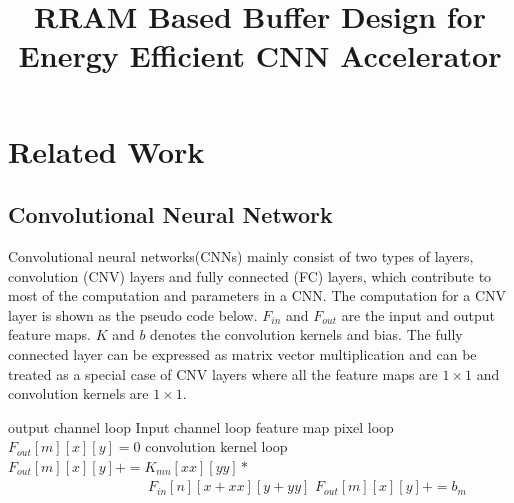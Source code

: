 \documentclass[10pt, conference]{IEEEtran}
\begin{document}
    
    \title{\Large\textbf{RRAM Based Buffer Design for Energy Efficient CNN Accelerator}}
    
    \author{
    }
    
    \maketitle
    
        
    
    
    
    
    \section{Related Work}
    \subsection{Convolutional Neural Network}
    Convolutional neural networks(CNNs) mainly consist of two types of layers, convolution (CNV) layers and fully connected (FC) layers, which contribute to most of the computation and parameters in a CNN. The computation for a CNV layer is shown as the pseudo code below. $F_{in}$ and $F_{out}$ are the input and output feature maps. $K$ and $b$ denotes the convolution kernels and bias. The fully connected layer can be expressed as matrix vector multiplication and can be treated as a special case of CNV layers where all the feature maps are $1\times 1$ and convolution kernels are $1\times 1$.
    
    \begin{codebox}
    \li \Comment output channel loop
    \li {} 
      \Do
    \li   \Comment Input channel loop
    \li   {}
        \Do
    \li  	\Comment feature map pixel loop
    \li 	{}
        \Do
    \li   	  $F_{out}[m][x][y]=0$
    \li 	  \Comment convolution kernel loop
    \li 	  {}
              \Do
    \li 		$F_{out}[m][x][y] += K_{mn}[xx][yy]*$\\
          $\qquad\qquad\qquad\qquad\qquad F_{in}[n][x+xx][y+yy] $
              \End
    \li 	  $F_{out}[m][x][y]+=b_m$
            \End 
        \End
        \End 
    \end{codebox}
    
\end{document}
